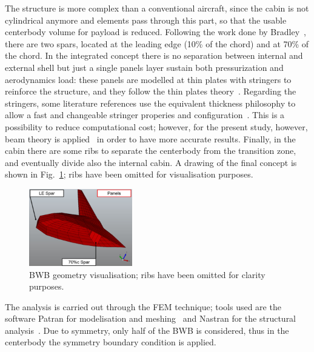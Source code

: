 The structure is more complex than a conventional aircraft, since the cabin is not cylindrical anymore and elements pass through this part, so that the usable centerbody volume for payload is reduced.
Following the work done by Bradley~\cite{bib:bradley_bwb}, there are two spars, located at the leading edge (10\% of the chord) and at 70\% of the chord. 
In the integrated concept there is no separation between internal and external shell but just a single panels layer sustain both pressurization and aerodynamics load: these panels are modelled at thin plates with stringers to reinforce the structure, and they follow the thin plates theory~\cite{bib:megson}. 
Regarding the stringers, some literature references use the equivalent thickness philosophy to allow a fast and changeable stringer properies and configuration~\cite{bib:bradley_bwb, bib:mukhopadhayay_2005}. 
This is a possibility to reduce computational cost; however, for the present study, however, beam theory is applied~\cite{bib:megson} in order to have more accurate results. 
Finally, in the cabin there are some ribs to separate the centerbody from the transition zone, and eventually divide also the internal cabin.
A drawing of the final concept is shown in Fig.~\ref{fig:bwb_internal_structure_design}; ribs have been omitted for visualisation purposes. 
\begin{figure}[!h]
	\centering
	\includegraphics[keepaspectratio, width=0.4\textwidth]{images/chap4/bwb_internal_structure.jpg}
	\caption{BWB geometry visualisation; ribs have been omitted for clarity purposes.}
	\label{fig:bwb_internal_structure_design}
\end{figure}

The analysis is carried out through the FEM technique; tools used are the software Patran for modelisation and meshing~\cite{bib:patran} and Nastran for the structural analysis~\cite{bib:nastran}. 
Due to symmetry, only half of the BWB is considered, thus in the centerbody the symmetry boundary condition is applied.  


